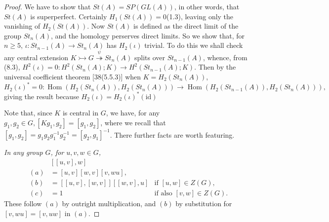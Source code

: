 \documentclass[openany,leqno]{book}  %
\newcommand{\Hom}{\mathop{\mathrm{Hom}}} %
\newcommand{\id}{\mathrm{id}} %
\newcommand{\cofi}{\rightarrowtail} %
\newcommand{\fib}{\twoheadrightarrow} %
\begin{document}
\begin{proof}
We have to show that $St(A)=SP(GL(A))$, in other words, that $St(A)$ is superperfect. Certainly $H_1(St(A))=0$(1.3), leaving only the vanishing of $H_2(St(A))$. Now $St(A)$ is defined as the direct limit of the group $St_n(A)$, and the homology perserves direct limits. So we show that, for $n\geqslant 5$, $\iota\colon  St_{n-1}(A)\rightarrow St_n(A)$ has $H_2(\iota)$ trivial. To do this we shall check any central extension $K \cofi G \overset{\psi}{\fib} St_n(A)$ splits over $St_{n-1}(A)$, whence, from (8.3), $H^2(\iota)=0\colon   H^2(St_n(A);K)\rightarrow H^2(St_{n-1}(A);K)$. Then by the universal coefficient theorem [38(5.5.3)] when $K=H_2(St_n(A))$,
\[H_2(\iota)^*=0\colon   \Hom (H_2(St_n(A)), H_2(St_n(A)))\rightarrow \Hom (H_2(St_{n-1}(A)), H_2(St_n(A))),\]
giving the result because $H_2(\iota)=H_2(\iota)^*(\id)$

Note that, since $K$ is central in $G$, we have, for any $g_1,g_2\in G, [Kg_1, g_2]=[g_1, g_2]$, where we recall that $[g_1, g_2]=g_1g_2g_1^{-1}g_2^{-1}=[g_2, g_1]^{-1}$. There further facts are worth featuring.

{\em In any group $G$, for $u,v,w\in G$,}
\begin{equation*}
\begin{array}{rlc}
& [[u,v],w] \\
(a) & =[u,v][w,v][v,wu],\\
(b) &=[[u,v],[w,v]][[w,v],u] &\text{if } [u,w]\in Z(G), \\
(c) &=1 & \text{if also } [v,w]\in Z(G).
\end{array}
\end{equation*}
These follow $(a)$ by outright multiplication, and $(b)$ by substitution for $[v,wu]=[v,uw]$ in $(a)$. 


\end{proof}
\end{document}

